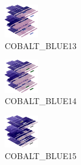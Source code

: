 \hspace{0.1cm}
\begin{minipage}[b]{0.15\linewidth}
\begin{figure}[H]                                                          
  \centering                                                             
  \begin{adjustbox}{width=1.5cm,center}                                   
  \includegraphics[width=1.5cm]{src/colorspace_colourflow/flows/colourflow_109-45.png}%
  \end{adjustbox}                                                        
\caption*{COBALT\_BLUE13}                                           
\end{figure}                                                               
\end{minipage}
\hspace{0.1cm}
\begin{minipage}[b]{0.15\linewidth}
\begin{figure}[H]                                                          
  \centering                                                             
  \begin{adjustbox}{width=1.5cm,center}                                   
  \includegraphics[width=1.5cm]{src/colorspace_colourflow/flows/colourflow_110-45.png}%
  \end{adjustbox}                                                        
\caption*{COBALT\_BLUE14}                                           
\end{figure}                                                               
\end{minipage}
\hspace{0.1cm}
\begin{minipage}[b]{0.15\linewidth}
\begin{figure}[H]                                                          
  \centering                                                             
  \begin{adjustbox}{width=1.5cm,center}                                   
  \includegraphics[width=1.5cm]{src/colorspace_colourflow/flows/colourflow_111-45.png}%
  \end{adjustbox}                                                        
\caption*{COBALT\_BLUE15}                                           
\end{figure}                                                               
\end{minipage}
